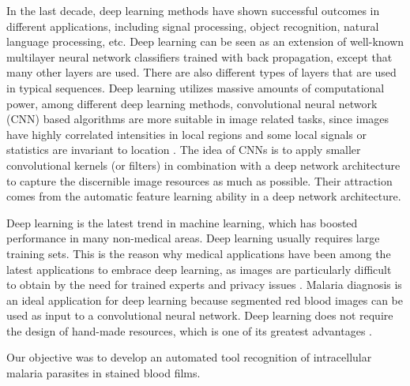 In the last decade, deep learning  methods have shown successful outcomes in different applications, including signal processing, object recognition, natural language processing, etc. Deep learning can be seen as an extension of well-known multilayer neural network classifiers trained with back propagation, except that many other layers are used. There are also different types of layers that are used in typical sequences. Deep learning utilizes massive amounts of computational power, among different deep learning methods, convolutional neural network (CNN) based algorithms are more suitable in image related tasks, since images have highly correlated intensities in local regions and some local signals or statistics are invariant to location \cite{Yan2017Multi-InstanceRecognition}. The idea of CNNs is to apply smaller convolutional kernels (or filters) in combination with a deep network architecture to capture the discernible image resources as much as possible. Their attraction comes from the automatic feature learning ability in a deep network architecture. 

Deep learning is the latest trend in machine learning, which has boosted performance in many non-medical areas. Deep learning usually requires large training sets. This is the reason why medical applications have been among the latest applications to embrace deep learning, as images are particularly difficult to obtain by the need for trained experts and privacy issues \cite{Dong2017a}. Malaria diagnosis is an ideal application for deep learning because segmented red blood images can be used as input to a convolutional neural network. Deep learning does not require the design of hand-made resources, which is one of its greatest advantages \cite{Liang2017}.

Our objective was to develop an automated tool recognition of intracellular malaria parasites in stained blood films.   